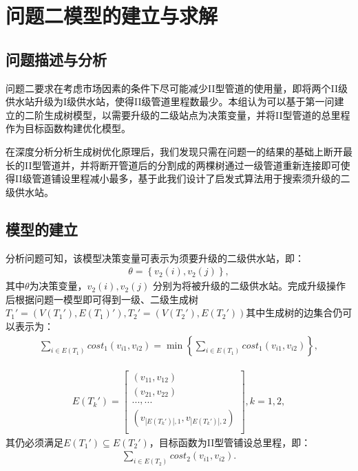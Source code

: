 \documentclass{whutmod}
\begin{document}
     \newpage
	\section{问题二模型的建立与求解}
		\subsection{问题描述与分析}	
			问题二要求在考虑市场因素的条件下尽可能减少II型管道的使用量，即将两个II级供水站升级为I级供水站，使得II级管道里程数最少。本组认为可以基于第一问建立的二阶生成树模型，以需要升级的二级站点为决策变量，并将II型管道的总里程作为目标函数构建优化模型。
			
			在深度分析分析生成树优化原理后，我们发现只需在问题一的结果的基础上断开最长的II型管道并，并将断开管道后的分割成的两棵树通过一级管道重新连接即可使得II级管道铺设里程减小最多，基于此我们设计了启发式算法用于搜索须升级的二级供水站。
			\subsection{模型的建立}
			分析问题可知，该模型决策变量可表示为须要升级的二级供水站，即：
				\begin{gather}
				\theta =\left \{ v_2(i),v_2(j) \right \},
				\end{gather}
			其中$\theta$为决策变量，$v_2(i),v_2(j)$ 分别为将被升级的二级供水站。完成升级操作后根据问题一模型即可得到一级、二级生成树$T_{1}'=(V(T_{1}'),E(T_{1})'),T_{2}'=(V(T_{2}'),E(T_{2}'))$其中生成树的边集合仍可以表示为：
			\begin{gather}
			\displaystyle \sum_{i\in E(T_1) }cost_1(v_{i1},v_{i2})=\min\left \{ 	\sum_{i\in E(T_1) }cost_1(v_{i1},v_{i2}) \right \},
			\end{gather}
			
			\begin{gather}
			E(T_k')=
		\begin{bmatrix}
		(v_{11} ,v_{12}) \\ 
		(v_{21} ,v_{22} )\\ 
		...,...\\
		(v_{|E(T_k')|,1},v_{|E(T_k')|,2})\\
		\end{bmatrix},k=1,2,
			\end{gather}
			其仍必须满足$E(T_1')\subseteq E(T_2')$，目标函数为II型管铺设总里程，即：
			\begin{gather}
			\sum_{i\in E(T_2) }cost_2(v_{i1},v_{i2}).
			\end{gather}
			
\end{document}
